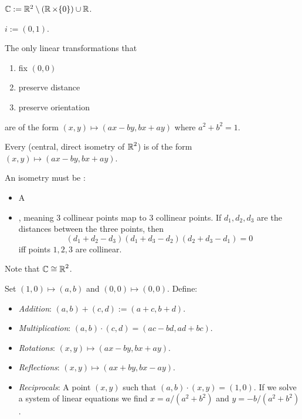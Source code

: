 \begin{definition}
$\operatorname{\mathbb{C}} := \mathbb{R}^2 \setminus (\operatorname{\mathbb{R}} \times \{0\}) \cup \operatorname{\mathbb{R}}$.
\end{definition}

\begin{definition}
    $i := (0,1)$.
\end{definition}

\begin{theorem}
    The only linear transformations that
    \begin{enumerate}
        \item fix $(0,0)$
        \item preserve distance
        \item preserve orientation
    \end{enumerate}
    are of the form $(x,y) \mapsto (ax - by, bx + ay)$ where $a^2 + b^2 = 1$.
\end{theorem}

\noindent
Every  (central, direct isometry of $\operatorname{\mathbb{R}}^2$)
is of the form $(x,y) \mapsto (ax-by, bx+ay)$.

An isometry must be :
\begin{itemize}
    \item A  
    \item {}, meaning $3$ collinear points map to $3$ collinear points.
    If $d_1, d_2, d_3$ are the distances between the three points, then
    \[ (d_1 + d_2 - d_3)(d_1 + d_3 - d_2)(d_2 + d_3 - d_1) = 0 \]
    iff points $1,2,3$ are collinear.
\end{itemize}

\noindent
Note that $\operatorname{\mathbb{C}} \cong \operatorname{\mathbb{R}}^2$.

Set $(1,0) \mapsto (a,b)$ and $(0,0) \mapsto (0,0)$.
Define:
\begin{itemize}
    \item \textit{Addition}: $(a,b) + (c,d) := (a+c, b+d)$.
    \item \textit{Multiplication}: $(a,b) \cdot (c,d) = (ac - bd, ad + bc)$.
    \item \textit{Rotations}: $(x,y) \mapsto (ax - by, bx + ay)$.
    \item \textit{Reflections}: $(x,y) \mapsto (ax + by, bx - ay)$.
    \item \textit{Reciprocals}: A point $(x,y)$ such that $(a,b) \cdot (x,y) = (1,0)$.
    If we solve a system of linear equations we find $x = a/(a^2 + b^2)$ and $y = -b/(a^2+b^2)$.
\end{itemize}

%
